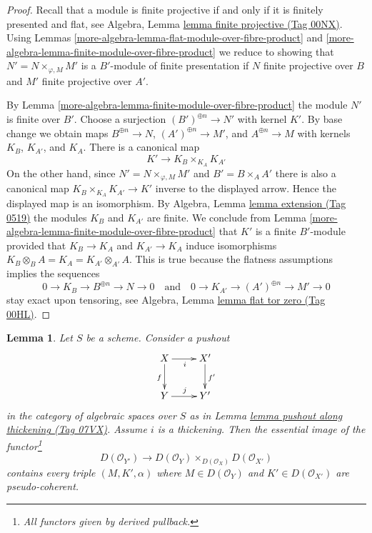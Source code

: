 \documentclass{amsart}
\theoremstyle{plain}
\newtheorem{lemma}[subsection]{Lemma}
\theoremstyle{definition}
\theoremstyle{remark}
\numberwithin{equation}{subsection}
\begin{document}
\begin{proof}
Recall that a module is finite projective if and only if
it is finitely presented and flat, see
Algebra, Lemma \href{https://stacks.math.columbia.edu/tag/00NX}{lemma finite projective (Tag 00NX)}.
Using Lemmas \ref{more-algebra-lemma-flat-module-over-fibre-product} and
\ref{more-algebra-lemma-finite-module-over-fibre-product}
we reduce to showing that $N' = N \times_{\varphi, M} M'$ is
a $B'$-module of finite presentation if
$N$ finite projective over $B$
and $M'$ finite projective over $A'$.

\medskip\noindent
By Lemma \ref{more-algebra-lemma-finite-module-over-fibre-product}
the module $N'$ is finite over $B'$. Choose a surjection
$(B')^{\oplus n} \to N'$ with kernel $K'$. By base change we obtain maps
$B^{\oplus n} \to N$, $(A')^{\oplus n} \to M'$, and $A^{\oplus n} \to M$
with kernels $K_B$, $K_{A'}$, and $K_A$. There is a canonical map
$$
K' \longrightarrow K_B \times_{K_A} K_{A'}
$$
On the other hand, since $N' = N \times_{\varphi, M} M'$ and
$B' = B \times_A A'$ there is also a
canonical map $K_B \times_{K_A} K_{A'} \to K'$ inverse to the displayed
arrow. Hence the displayed map is an isomorphism. By
Algebra, Lemma \href{https://stacks.math.columbia.edu/tag/0519}{lemma extension (Tag 0519)}
the modules $K_B$ and $K_{A'}$ are finite. We conclude from
Lemma \ref{more-algebra-lemma-finite-module-over-fibre-product}
that $K'$ is a finite $B'$-module provided that $K_B \to K_A$ and
$K_{A'} \to K_A$ induce isomorphisms
$K_B \otimes_B A = K_A = K_{A'} \otimes_{A'} A$.
This is true because the flatness assumptions implies the sequences
$$
0 \to K_B \to B^{\oplus n} \to N \to 0
\quad\text{and}\quad
0 \to K_{A'} \to (A')^{\oplus n} \to M' \to 0
$$
stay exact upon tensoring, see
Algebra, Lemma \href{https://stacks.math.columbia.edu/tag/00HL}{lemma flat tor zero (Tag 00HL)}.
\end{proof}


\begin{lemma}
\label{lemma-pushout-along-thickening-derived}
Let $S$ be a scheme. Consider a pushout
$$
\xymatrix{
X \ar[r]_i \ar[d]_f & X' \ar[d]^{f'}
\\
Y \ar[r]^j & Y'
}
$$
in the category of algebraic spaces over $S$
as in Lemma \href{https://stacks.math.columbia.edu/tag/07VX}{lemma pushout along thickening (Tag 07VX)}.
Assume $i$ is a thickening. Then the essential
image of the functor\footnote{All functors given by derived pullback.}
$$
D(\mathcal{O}_{Y'}) \longrightarrow
D(\mathcal{O}_Y) \times_{D(\mathcal{O}_X)} D(\mathcal{O}_{X'})
$$
contains every triple $(M, K', \alpha)$ where $M \in D(\mathcal{O}_Y)$
and $K' \in D(\mathcal{O}_{X'})$ are pseudo-coherent.
\end{lemma}
\end{document}
